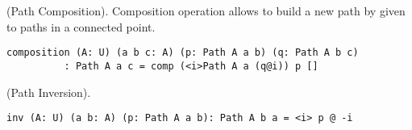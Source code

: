 \begin{definition} (Path Composition).
Composition operation allows to build a new path by given to paths
in a connected point.
\begin{center}
\end{center}
\begin{lstlisting}
composition (A: U) (a b c: A) (p: Path A a b) (q: Path A b c)
          : Path A a c = comp (<i>Path A a (q@i)) p []
\end{lstlisting}
\end{definition}

\begin{theorem} (Path Inversion).
\begin{lstlisting}
inv (A: U) (a b: A) (p: Path A a b): Path A b a = <i> p @ -i
\end{lstlisting}
\end{theorem}

